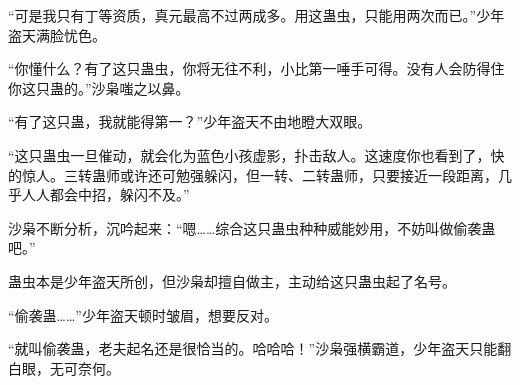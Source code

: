 \begin{this_body}
“可是我只有丁等资质，真元最高不过两成多。用这蛊虫，只能用两次而已。”少年盗天满脸忧色。

“你懂什么？有了这只蛊虫，你将无往不利，小比第一唾手可得。没有人会防得住你这只蛊的。”沙枭嗤之以鼻。

“有了这只蛊，我就能得第一？”少年盗天不由地瞪大双眼。

“这只蛊虫一旦催动，就会化为蓝色小孩虚影，扑击敌人。这速度你也看到了，快的惊人。三转蛊师或许还可勉强躲闪，但一转、二转蛊师，只要接近一段距离，几乎人人都会中招，躲闪不及。”

沙枭不断分析，沉吟起来：“嗯……综合这只蛊虫种种威能妙用，不妨叫做偷袭蛊吧。”

蛊虫本是少年盗天所创，但沙枭却擅自做主，主动给这只蛊虫起了名号。

“偷袭蛊……”少年盗天顿时皱眉，想要反对。

“就叫偷袭蛊，老夫起名还是很恰当的。哈哈哈！”沙枭强横霸道，少年盗天只能翻白眼，无可奈何。

\end{this_body}

